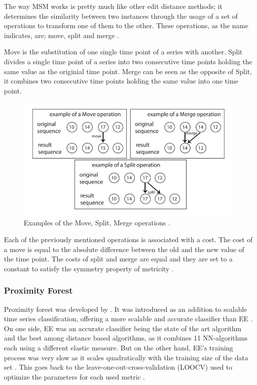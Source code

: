 The way MSM works is pretty much like other edit distance methods; it determines the similarity between two instances
through the usage of a set of operations to transform one of them to the other. These operations, as the name indicates, are; move, split and merge \cite{bagnall2017great}.

Move is the substitution of one single time point of a series with another.
Split divides a single time point of a series into two consecutive time points holding the same value as the originial time point.
Merge can be seen as the opposite of Split, it combines two consecutive time points holding the same value into one time point.

\begin{figure}[!htbp]
    \captionsetup{justification=raggedright}
    \centering
    \includegraphics[scale = 0.5]{MSM.JPG}
    \centering
    \caption{Examples of the Move, Split, Merge operations \cite{stefan2012move}.}
    \label{Img:MSM}
\end{figure}

Each of the previously mentioned operations is associated with a cost.
The cost of a move is equal to the absolute difference between the old and the new value of the time point.
The costs of split and merge are equal and they are set to a constant to satisfy the symmetry property of metricity \cite{stefan2012move,tan2020fastee}.
\subsubsection{Proximity Forest}
\label{SubsubsectionPForest}
Proximity forest was developed by \cite{lucas2019proximity}.
It was introduced as an addition to scalable time series classification, offering a more scalable and accurate classifier than EE \cite{tan2020fastee}.
On one side, EE was an accurate classifier being the state of the art algorithm and the best among distance based algorithms, as it combines 11 NN-algorithms each using a different elastic measure.
But on the other hand, EE's training process was very slow as it scales quadratically with the training size of the data set \cite{lines2015time,bagnall2017great}.
This goes back to the leave-one-out-cross-validation (LOOCV) used to optimize the parameters for each used metric \cite{shifaz2020ts}.

